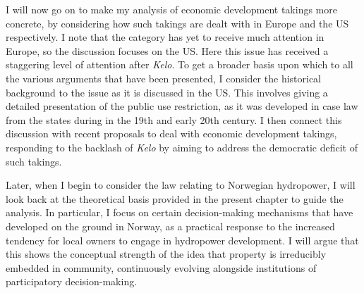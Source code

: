 {I will now go on to make my analysis of economic development takings more concrete, by considering how such takings are dealt with in Europe and the US respectively. I note that the category has yet to receive much attention in Europe, so the discussion focuses on the US. Here this issue has received a staggering level of attention after {\it Kelo}. To get a broader basis upon which to  all the various arguments that have been presented, I consider the historical background to the issue as it is discussed in the US. This involves giving a detailed presentation of the public use restriction, as it was developed in case law from the states during in the 19th and early 20th century. I then connect this discussion with recent proposals to deal with economic development takings, responding to the backlash of {\it Kelo} by aiming to address the democratic deficit of such takings.

Later, when I begin to consider the law relating to Norwegian hydropower, I will look back at the theoretical basis provided in the present chapter to guide the analysis. In particular, I focus on certain decision-making mechanisms that have developed on the ground in Norway, as a practical response to the increased tendency for local owners to engage in hydropower development. I will argue that this shows the conceptual strength of the idea that property is irreducibly embedded in community, continuously evolving alongside institutions of participatory decision-making. }